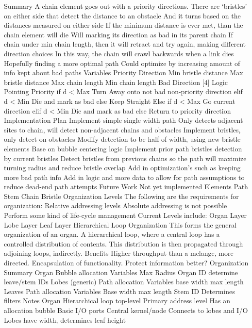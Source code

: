 \documentclass[article,12pt,oneside]{memoir}
\begin{document}
Summary
A chain element goes out with a priority directions.
There are ‘bristles’ on either side that detect the distance to an obstacle
And it turns based on the distances measured on either side
If the minimum distance is ever met, than the chain element will die
Will marking its direction as bad in its parent chain
If chain under min chain length, then it will retract and try again, making different direction choices
In this way, the chain will crawl backwards when a link dies
Hopefully finding a more optimal path
Could optimize by increasing amount of info kept about bad paths
Variables
Priority Direction
Min bristle distance
Max bristle distance
Max chain length
Min chain length
Bad Direction [4]
Logic
Pointing Priority
if d < Max
Turn Away onto not bad non-priority direction
elif d < Min
Die and mark as bad
else
Keep Straight
Else
if d < Max
Go current direction
elif d < Min
Die and mark as bad
else
Return to priority direction
Implementation Plan
Implement simple single width path
Only detects adjacent sites to chain, will detect non-adjacent chains and obstacles
Implement bristles, only detect on obstacles
Modify detection to be half of width, using new bristle elements Base on bubble centering logic
Implement prior path bristles detection by current bristles
Detect bristles from previous chains so the path will maximize turning radius and reduce bristle overlap
Add in optimization’s such as keeping more bad path info
Add in logic and more data to allow for path assumptions to reduce dead-end path attempts
Future Work
Not yet implemented
Elements
Path Stem
Chain
Bristle
Organization Levels
The following are the requirements for organization:
Relative addressing levels
Absolute addressing is not possible
Perform some kind of life-cycle management
Current Levels include:
Organ Layer
Lobe Layer
Leaf Layer
Hierarchical Loop Organization
This forms the general organization of an organ. A hierarchical loop, where a central loop has a controlled distribution of contents. This distribution is then propagated through adjoining loops, indirectly.
Benefits
Higher throughput than a melange, more directed. Encapsulation of functionality. Protect information better?
Organization Summary
Organ
Bubble allocation
Variables
Max Radius
Organ ID
determine leave/stem IDs
Lobes (generic)
Path allocation
Variables
base width
max length
Leaves
Path allocation
Variables
Base width
max length
Stem ID
Determines filters
Notes
Organ
Hierarchical loop top-level
Primary address level
Has an allocation bubble
Basic I/O ports
Central kernel/node
Connects to lobes and I/O
Lobes have width, determines leaf height
\end{document}
